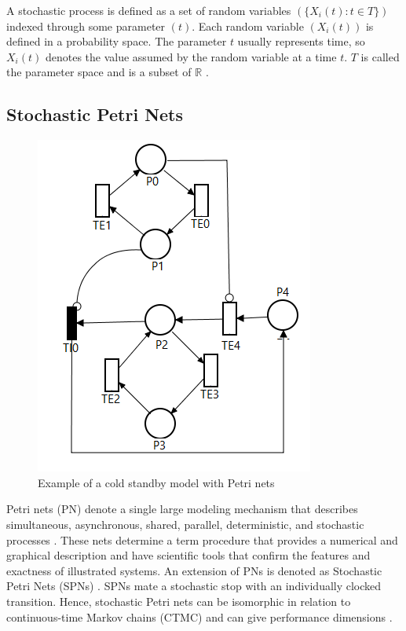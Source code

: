 \documentclass[conference]{IEEEtran}
\begin{document}
A stochastic process is defined as a set of random variables $(\{ X_{i}(t):t \in T \})$ indexed through some parameter $(t)$. Each random variable $(X_i(t))$ is defined in a probability space. The parameter $t$ usually represents time, so $X_{i}(t)$ denotes the value assumed by the random variable at a time $t$. $T$  is called the parameter space and is a subset of $\mathbb{R}$ \citep{maciel2021survey}.

\subsection{Stochastic Petri Nets}

\begin{figure}[htbp]
\centerline{\includegraphics[scale=0.5]{img/cold-standby-example.png}}
\caption{Example of a cold standby model with Petri nets}
\label{fig:stochastic_petri_net_example}
\end{figure}

Petri nets (PN) denote a single large modeling mechanism that describes simultaneous, asynchronous, shared, parallel, deterministic, and stochastic processes \citep{german2000performance}. These nets determine a term procedure that provides a numerical and graphical description and have scientific tools that confirm the features and exactness of illustrated systems. An extension of PNs is denoted as Stochastic Petri Nets (SPNs) \citep{marsan1998modelling}. SPNs mate a stochastic stop with an individually clocked transition. Hence, stochastic Petri nets can be isomorphic in relation to continuous-time Markov chains (CTMC) and can give performance dimensions \citep{molloy1982integration}.
\end{document}
